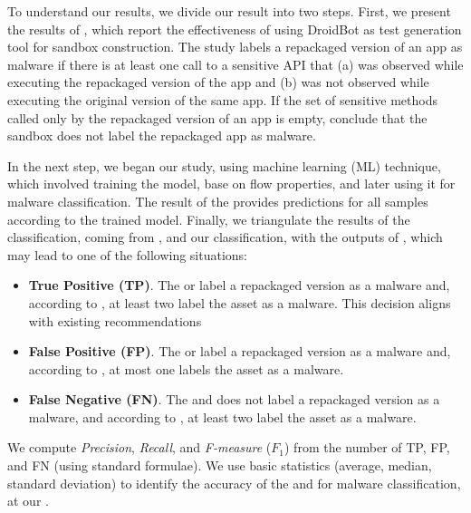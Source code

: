 To understand our results, we divide our result into two steps. First, we present the results of \fhc, which report the effectiveness of \mas using DroidBot as test generation tool for sandbox construction. The study labels a repackaged version of an app as malware if there is at least one call to a sensitive API that (a) was observed while executing the repackaged version of the app and (b) was not observed while executing the original version of the same app. If the set of sensitive methods called only by the repackaged version of an app is empty,  \fhc conclude that the sandbox does not label the repackaged app as malware.

In the next step, we began our study, using machine learning (ML) technique, which involved training the model, base on flow properties, and later using it for malware classification. The result of the \ml provides predictions for all samples according to the trained model. Finally, we triangulate the results of the \mas classification, coming from \fhc, and our \ml classification, with the outputs of \vt, which may lead to one of the following situations:

\begin{itemize}
\item {\bf True Positive (TP)}. The \mas or \ml label a repackaged version as a malware and, according to
  \vt, at least two \ses label the asset as a malware. This decision aligns with existing recommendations~\cite{vt-label,DBLP:journals/ese/KhanmohammadiEH19}
   
\item {\bf False Positive (FP)}. The \mas or \ml label a repackaged version as a malware and, according to \vt, at most one \se labels the asset as a malware.

\item {\bf False Negative (FN)}. The \mas and \ml does not label a repackaged version as a malware, and according to \vt, at least two \ses label the asset as a malware.
\end{itemize}

We compute \emph{Precision}, \emph{Recall}, and \emph{F-measure} ($F_1$) from
the number of TP, FP, and FN (using standard
formulae). We use basic statistics (average, median, standard deviation) to identify the
accuracy of the \mas and \ml for malware classification, at our \cds.
